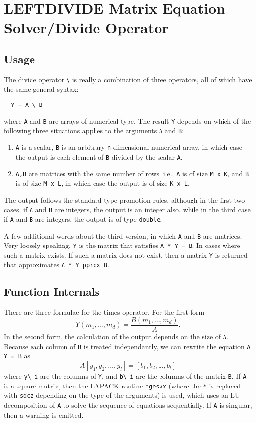 \section{LEFTDIVIDE Matrix Equation Solver/Divide Operator}

\subsection{Usage}

The divide operator \verb|\| is really a combination of three
operators, all of which have the same general syntax:
\begin{verbatim}
  Y = A \ B
\end{verbatim}
where \verb|A| and \verb|B| are arrays of numerical type.  The result \verb|Y| depends
on which of the following three situations applies to the arguments
\verb|A| and \verb|B|:
\begin{enumerate}
  \item \verb|A| is a scalar, \verb|B| is an arbitrary \verb|n|-dimensional numerical array, in which case the output is each element of \verb|B| divided by the scalar \verb|A|.
  \item \verb|A,B| are matrices with the same number of rows, i.e., \verb|A| is of size \verb|M x K|, and \verb|B| is of size \verb|M x L|, in which case the output is of size \verb|K x L|.
\end{enumerate}
The output follows the standard type promotion rules, although in the first two cases, if \verb|A| and \verb|B| are integers, the output is an integer also, while in the third case if \verb|A| and \verb|B| are integers, the output is of type \verb|double|.

A few additional words about the third version, in which \verb|A| and \verb|B| are matrices.  Very loosely speaking, \verb|Y| is the matrix that satisfies \verb|A * Y = B|.  In cases where such a matrix exists.  If such a matrix does not exist, then a matrix \verb|Y| is returned that approximates \verb|A * Y pprox B|.
\subsection{Function Internals}

There are three formulae for the times operator.  For the first form
\[
Y(m_1,\ldots,m_d) = \frac{B(m_1,\ldots,m_d)}{A}.
\]
In the second form, the calculation of the output depends on the size of \verb|A|. Because each column of \verb|B| is treated independantly, we can rewrite the equation \verb|A Y = B| as
\[
  A [y_1, y_2,\ldots, y_l] = [b_1, b_2, \ldots, b_l]
\]
where \verb|y\_i| are the columns of \verb|Y|, and \verb|b\_i| are the columns of the matrix \verb|B|. If \verb|A| is a square matrix, then the LAPACK routine \verb|*gesvx| (where the \verb|*| is replaced with \verb|sdcz| depending on the type of the arguments) is used, which uses an LU decomposition of \verb|A| to solve the sequence of equations sequentially.  If \verb|A| is singular, then a warning is emitted. 

